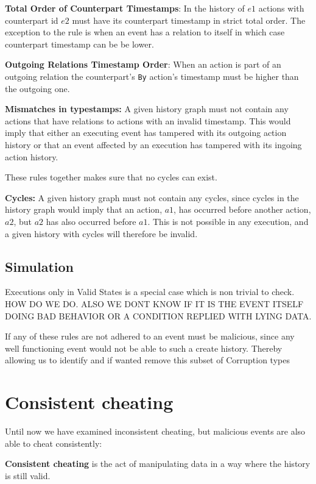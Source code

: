 	\newpar \textbf{Total Order of Counterpart Timestamps}: In the history of $e1$ actions with counterpart id $e2$ must have its counterpart timestamp in strict total order.  The exception to the rule is when an event has a relation to itself in which case counterpart timestamp can be be lower. 
	
	\newpar \textbf{Outgoing Relations Timestamp Order}: When an action is part of an outgoing relation the counterpart's \texttt{By} action's timestamp must be higher than the outgoing one. 
	
	\newpar \textbf{Mismatches in typestamps:} A given history graph must not contain any actions that have relations to actions with an invalid timestamp. This would imply that either an executing event has tampered with its outgoing action history or that an event affected by an execution has tampered with its ingoing action history. 
	
	\newpar These rules together makes sure that no cycles can exist.
	
	\textbf{Cycles:} A given history graph must not contain any cycles, since cycles in the history graph would imply that an action, $a1$, has occurred before another action, $a2$, but $a2$ has also occurred before $a1$. This is not possible in any execution, and a given history with cycles will therefore be invalid.
	
	
	
	
	
	\subsection{Simulation}
	Executions only in Valid States is a special case which is non trivial to check. HOW DO WE DO. ALSO WE DONT KNOW IF IT IS THE EVENT ITSELF DOING BAD BEHAVIOR OR A CONDITION REPLIED WITH LYING DATA.
	
	\newpar If any of these rules are not adhered to an event must be malicious, since any well functioning event would not be able to such a create history. Thereby allowing us to identify and if wanted remove this subset of Corruption types 
	
	\section{Consistent cheating}
	Until now we have examined inconsistent cheating, but malicious events are also able to cheat consistently:
	\begin{definition}
		\textbf{Consistent cheating} is the act of manipulating data in a way where the history is still valid.
	\end{definition}
	
